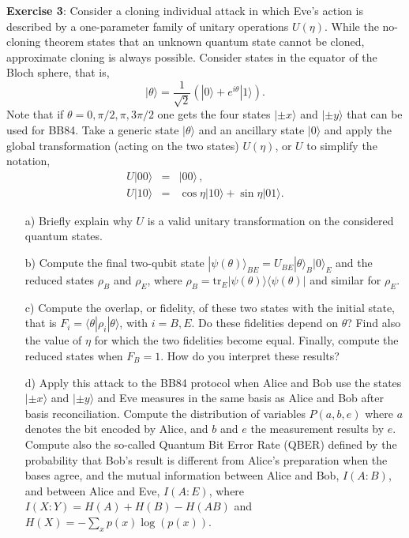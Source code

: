 \documentclass[a4paper]{article}
\def\tr{\mbox{tr}}
\def\bra#1{\langle#1|} \def\ket#1{|#1\rangle}
\def\proj#1{\ket{#1}\!\bra{#1}}
\begin{document}
\textbf{Exercise 3}: Consider a cloning individual attack in which Eve's action is described by a one-parameter family of unitary operations $U(\eta)$. While the no-cloning theorem states that an unknown quantum state
cannot be cloned, approximate cloning is always possible.
Consider states in the equator of the Bloch sphere, that is,
\begin{equation}\label{thetast}
    \ket{\theta}=\frac{1}{\sqrt
    2}\left(\ket{0}+e^{i\theta}\ket{1}\right) .
\end{equation}
Note that if $\theta=0,\pi/2,\pi,3\pi/2$ one gets the four states $\ket{\pm x}$ and $\ket{\pm y}$ that can be used for BB84. Take a generic state $\ket{\theta}$ and an ancillary state
$\ket{0}$ and apply the global transformation (acting on the two
states) $U(\eta)$, or $U$ to simplify the notation, 
\begin{eqnarray}
  U\ket{00} &=& \ket{00}\,, \nonumber\\
  U\ket{10} &=& \cos\eta\ket{10}+\sin\eta\ket{01} .
\end{eqnarray}
\begin{itemize}
\item[a)] Briefly explain why $U$ is a valid unitary transformation on the considered quantum states.
\item[b)] Compute the final two-qubit state $\ket{\psi(\theta)}_{BE}=U_{BE}\ket{\theta}_B\ket{0}_E$
and the reduced states $\rho_B$ and $\rho_E$, where
$\rho_B=\tr_E\proj{\psi(\theta)}$ and similar for $\rho_E$.
\item[c)] Compute the overlap, or fidelity, of these two states with the initial
state, that is $F_i=\bra{\theta}\rho_i\ket{\theta}$, with $i=B,E$.
Do these fidelities depend on $\theta$? Find also the value of
$\eta$ for which the two fidelities become equal. Finally, compute the
reduced states when $F_B=1$. How do you interpret these results?
\item[d)] Apply this attack to the BB84 protocol when Alice and Bob use the states $\ket{\pm x}$ and $\ket{\pm y}$ and Eve measures in the same basis as Alice and Bob after basis reconciliation. Compute the distribution of variables $P(a,b,e)$ where $a$ denotes the bit encoded by Alice, and $b$ and $e$ the measurement results by $e$. Compute also the so-called Quantum Bit Error Rate (QBER) defined by the probability that Bob's result is different from Alice's preparation when the bases agree, and the mutual information between Alice and Bob, $I(A:B)$, and between Alice and Eve, $I(A:E)$, where $I(X:Y)=H(A)+H(B)-H(AB)$ and $H(X)=-\sum_x p(x)\log(p(x))$.
\end{itemize}
\end{document}
